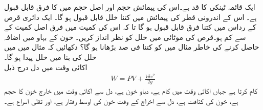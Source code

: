 ایک قائمہ ٹینکی کا قد  ہے۔اس کی پیمائش حجم اور اصل حجم میں  کا فرق قابل قبول ہے۔ اس کے اندرونی قطر کی پیمائش میں کتنا خلل قابل قبول ہو گا۔
ایک دائری قرص کے رداس میں کتنا فرق  قابل قبول ہو گا تا کہ اس کی کمیت میں فرق اصل کمیت کے  سے کم ہو۔قرص کی موٹائی میں خلل کو نظر انداز کریں۔ 
خون کے بہاو میں  اضافہ حاصل کرنے کی خاطر مثال  میں  کو کتنا فی صد بڑھانا ہو گا؟
دکھائیں کہ مثال  میں  میں  خلل کی بنا  میں  خلل پیدا ہو گا۔
\\
اکائی وقت میں دل درج ذیل
\begin{align*}
W=PV+\frac{V\delta v^2}{2g}
\end{align*}
کام کرتا ہے جہاں  اکائی وقت میں کام ہے،  دباو خون ہے،  دل سے اکائی وقت میں خارج خون کا حجم ہے، خون کی کثافت ہے،  دل سے اخراج کے وقت خون کی اوسط رفتار ہے، اور  ثقلی اسراع ہے۔

